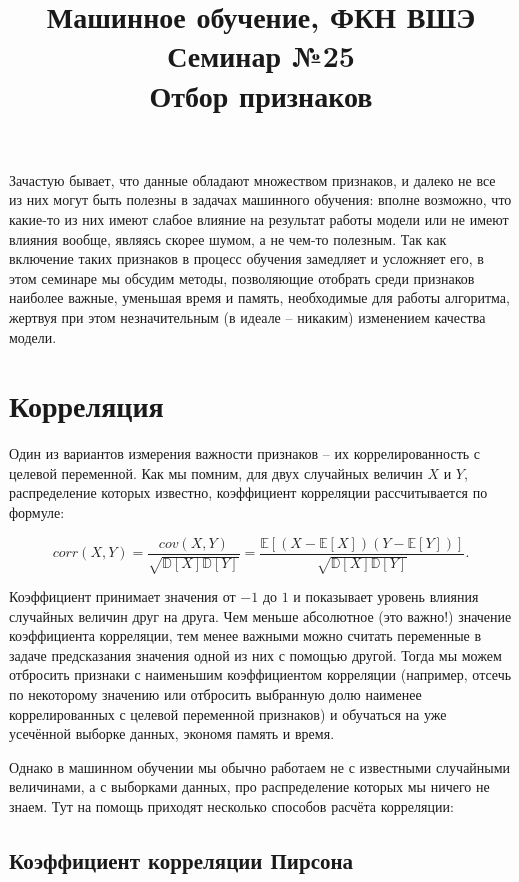 \documentclass[12pt,fleqn]{article}
\title{Машинное обучение, ФКН ВШЭ\\Семинар №25\\Отбор признаков}
\author{}
\date{}
\begin{document}
	\maketitle
	
	Зачастую бывает, что данные обладают множеством признаков, и далеко не все из них могут быть полезны в задачах машинного обучения: вполне возможно, что какие-то из них имеют слабое влияние на результат работы модели или не имеют влияния вообще, являясь скорее шумом, а не чем-то полезным. Так как включение таких признаков в процесс обучения замедляет и усложняет его, в этом семинаре мы обсудим методы, позволяющие отобрать среди признаков наиболее важные, уменьшая время и память, необходимые для работы алгоритма, жертвуя при этом незначительным (в идеале – никаким) изменением качества модели.
	
	\section{Корреляция}
	
	Один из вариантов измерения важности признаков -- их коррелированность с целевой переменной. Как мы помним, для двух случайных величин $ X $ и $ Y $, распределение которых известно, коэффициент корреляции рассчитывается по формуле:

	\[
	corr(X, Y) =
	\dfrac{cov(X, Y)}{\sqrt{\mathbb{D}[X]\mathbb{D}[Y]}} =
	\dfrac{\mathbb{E}\left[\left(X - \mathbb{E}[X]\right)\left(Y - \mathbb{E}[Y]\right)\right]}{\sqrt{\mathbb{D}[X]\mathbb{D}[Y]}}.
	\]

	Коэффициент принимает значения от $ -1 $ до $ 1 $ и показывает уровень влияния случайных величин друг на друга. Чем меньше абсолютное (это важно!) значение коэффициента корреляции, тем менее важными можно считать переменные в задаче предсказания значения одной из них с помощью другой. Тогда мы можем отбросить признаки с наименьшим коэффициентом корреляции (например, отсечь по некоторому значению или отбросить выбранную долю наименее коррелированных с целевой переменной признаков) и обучаться на уже усечённой выборке данных, экономя память и время.

	Однако в машинном обучении мы обычно работаем не с известными случайными величинами, а с выборками данных, про распределение которых мы ничего не знаем. Тут на помощь приходят несколько способов расчёта корреляции:

	\newpage

	\subsection{Коэффициент корреляции Пирсона}
\end{document}
